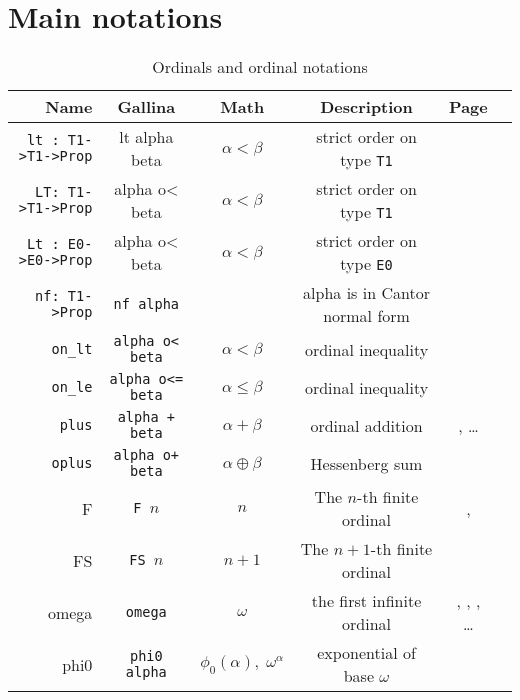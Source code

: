 \documentclass[a4paper]{book}
\begin{document}
\section{Main notations}






\begin{table}[H]
  \centering
  \begin{threeparttable}
    \caption{Ordinals and ordinal notations}
\begin{tabular}{|r | c|c|c|c|l|}
\hline
Name & Gallina&Math& Description& Page \\\hline
\texttt{lt : T1->T1->Prop}& lt alpha beta & $\alpha < \beta$& strict order on type \texttt{T1} \tnote{1} & \pageref{Predicates:lt-T1}\\
\texttt{LT: T1->T1->Prop}& alpha o< beta & $\alpha < \beta$& strict order on type \texttt{T1}   \tnote{2} & \pageref{Predicates:LT-T1}\\
\texttt{Lt : E0->E0->Prop} & alpha o< beta & $\alpha < \beta$& strict order on type \texttt{E0} \tnote{3} & \pageref{Predicates:Lt-E0} \\
\texttt{nf: T1->Prop} & \texttt{nf alpha} && alpha is in Cantor normal form & \pageref{Predicates:nf-T1}\\
 \texttt{on\_lt} & \texttt{alpha o< beta}&$\alpha<\beta$& ordinal inequality \tnote{4} & \pageref{sect:on-lt-notation}\\
 \texttt{on\_le} & \texttt{alpha o<= beta}&$\alpha\leq\beta$& ordinal inequality & \pageref{sect:on-lt-notation}\\
\texttt{plus} & \texttt{alpha + beta} & $\alpha + \beta$ & ordinal addition & \pageref{sect:infix-plus-T1}, \dots\\
\texttt{oplus} & \texttt{alpha o+ beta} & $\alpha \oplus \beta$ & Hessenberg sum & \pageref{sect:infix-oplus} \\

F & \texttt{F $n$} & $n$ & The $n$-th finite ordinal &  
\pageref{sect:notation-F}, \pageref{sect:notation-F-sch}\\ 
FS & \texttt{FS $n$} & $n+1$ & The $n+1$-th finite ordinal  \tnote{5} &  
\pageref{sect:notation-FS}\\ 
omega & \texttt{omega} & $\omega$ &   the first infinite ordinal   & \pageref{sect:notation-omega}, \pageref{sect:omega-T1}, \pageref{sect:omega-notation2}, \dots\\
phi0     & \texttt{phi0 alpha} & $\phi_0(\alpha),\; \omega^\alpha$&exponential of base $\omega$ & \pageref{sect:notation-phi0}\\


\end{tabular}
\end{threeparttable}
\end{table}
\end{document}
